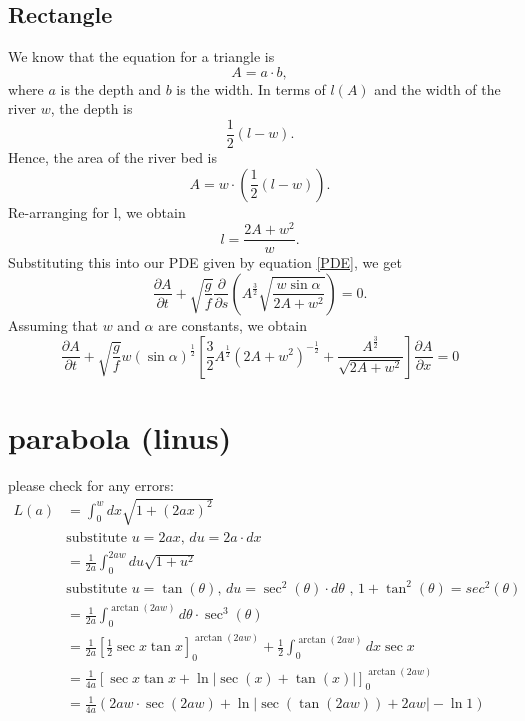 \documentclass[12pt]{article}
\begin{document}
\subsection{Rectangle}
We know that the equation for a triangle is
\begin{equation}
    A = a \cdot b,
\end{equation}
where $a$ is the depth and $b$ is the width.  In terms of $l(A)$ and the width of the river $w$, the depth is
\begin{equation}
    \frac{1}{2}(l-w).
\end{equation}
Hence, the area of the river bed is
\begin{equation}
    A=w\cdot \left(\frac{1}{2}(l-w)\right).
\end{equation}
Re-arranging for l, we obtain
\begin{equation}
    l = \frac{2A+w^2}{w}.
\end{equation}
Substituting this into our PDE given by equation \ref{PDE}, we get
\begin{equation}
    \frac{\partial A}{\partial t} + \sqrt{\frac{g}{f}}\frac{\partial}{\partial s}\left(A^{\frac{3}{2}}\sqrt{\frac{w\sin\alpha}{2A+w^2}}\right) = 0.
\end{equation}
Assuming that $w$ and $\alpha$ are constants, we obtain
\begin{equation}
    \frac{\partial A}{\partial t} + \sqrt{\frac{g}{f}}w(\sin\alpha)^{\frac{1}{2}}\left[\frac{3}{2}A^{\frac{1}{2}}(2A+w^2)^{-\frac{1}{2}}+ \frac{A^{\frac{3}{2}}}{\sqrt{2A+w^2}}\right] \frac{\partial A}{\partial x} = 0
\end{equation}

\section{parabola (linus)}
please check for any errors:
\begin{equation}
    \begin{split}
        L(a)&=\int_0^wdx\sqrt{1 + (2ax)^2}
        \\ &\text{substitute }u=2ax\text{, }du=2a\cdot dx
        \\&=\frac{1}{2a}\int_0^{2aw}du\sqrt{1 + u^2}
        \\ &\text{substitute }u=\tan(\theta)\text{, }du=\sec^2(\theta)\cdot d\theta\text{ , }1 + \tan^2(\theta) = sec^2(\theta)
        \\&=\frac{1}{2a}\int_0^{\arctan{(2aw)}} d\theta \cdot \sec^3(\theta)
        \\&=\frac{1}{2a}\left[\frac{1}{2}\sec{x}\tan{x}\right] _0^{\arctan(2aw)}+ \frac{1}{2}\int_0^{\arctan(2aw)} dx\sec{x}
        \\&= \frac{1}{4a}\left[\sec{x}\tan{x} + \ln{|\sec(x)+\tan(x)|}\right]_0^{\arctan(2aw)}  
        \\&=\frac{1}{4a}(2aw\cdot\sec{(2aw)}+ \ln{|\sec({\tan(2aw)}) + 2aw|} - \ln{1})
    \end{split}
\end{equation}
\end{document}
